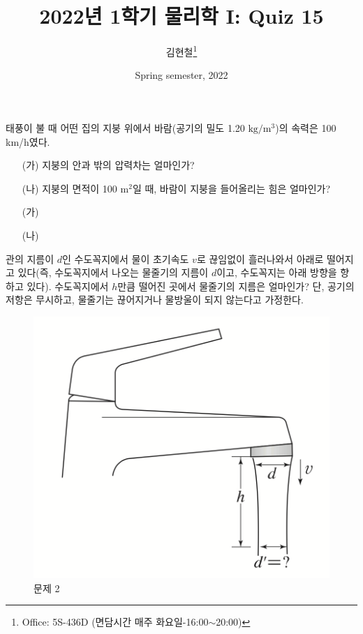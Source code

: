 \documentclass[floatfix,nofootinbib,superscriptaddress,fleqn]{revtex4-2}
\begin{document}
\title{\Large 2022년 1학기 물리학 I: Quiz 15}
\author{김현철\footnote{Office: 5S-436D (면담시간 매주
    화요일-16:00$\sim$20:00)}} 
\date{Spring semester, 2022}


\vspace{1.cm}

\maketitle


태풍이 불 때 어떤 집의 지붕 위에서 바람(공기의 밀도 1.20 $\mathrm{kg/m^3}$)의
속력은 100 km/h였다.
\begin{itemize}
\item[(가)] 지붕의 안과 밖의 압력차는 얼마인가? 
\item[(나)] 지붕의 면적이 100 $\mathrm{m^2}$일 때, 바람이 지붕을
  들어올리는 힘은 얼마인가? 
 \end{itemize}

 \begin{itemize}
  \item[(가)] 
  \item[(나)] 
 \end{itemize}




 \vspace{1.cm}

관의 지름이 $d$인 수도꼭지에서 물이 초기속도 $v$로 끊임없이 흘러나와서
아래로 떨어지고 있다(즉, 수도꼭지에서 나오는 물줄기의 지름이 $d$이고,
수도꼭지는 아래 방향을 향하고 있다). 수도꼭지에서 $h$만큼 떨어진 곳에서
물줄기의 지름은 얼마인가? 단, 공기의 저항은 무시하고, 물줄기는
끊어지거나 물방울이 되지 않는다고 가정한다.  
\begin{figure}[ht]
  \centering
\includegraphics[scale=0.6]{Qfig17-1-20220509.png}
  \caption{문제 2}
  \label{fig:2}
\end{figure}
\end{document}
